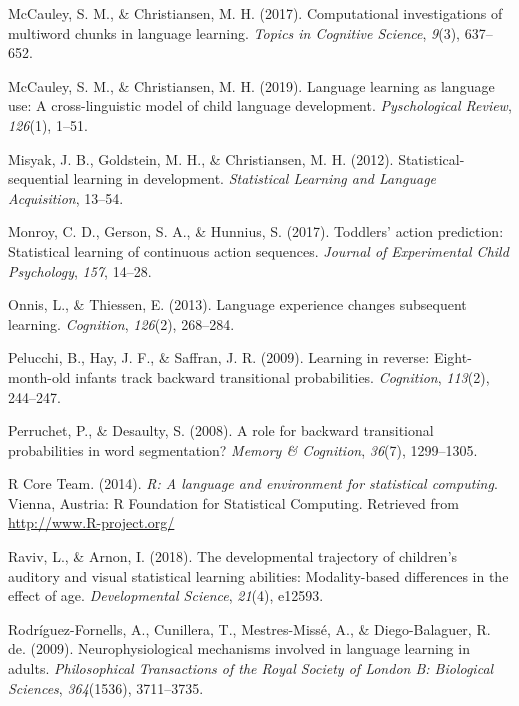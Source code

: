 \documentclass[man,mask,floatsintext]{apa6}
\begin{document}
\hypertarget{ref-mccauley2017computational}{}
McCauley, S. M., \& Christiansen, M. H. (2017). Computational
investigations of multiword chunks in language learning. \emph{Topics in
Cognitive Science}, \emph{9}(3), 637--652.

\hypertarget{ref-mccauley2019languagelearning}{}
McCauley, S. M., \& Christiansen, M. H. (2019). Language learning as
language use: A cross-linguistic model of child language development.
\emph{Pyschological Review}, \emph{126}(1), 1--51.

\hypertarget{ref-misyak2012statistical}{}
Misyak, J. B., Goldstein, M. H., \& Christiansen, M. H. (2012).
Statistical-sequential learning in development. \emph{Statistical
Learning and Language Acquisition}, 13--54.

\hypertarget{ref-monroy2017toddlers}{}
Monroy, C. D., Gerson, S. A., \& Hunnius, S. (2017). Toddlers' action
prediction: Statistical learning of continuous action sequences.
\emph{Journal of Experimental Child Psychology}, \emph{157}, 14--28.

\hypertarget{ref-onnis2013language}{}
Onnis, L., \& Thiessen, E. (2013). Language experience changes
subsequent learning. \emph{Cognition}, \emph{126}(2), 268--284.

\hypertarget{ref-pelucchi2009learning}{}
Pelucchi, B., Hay, J. F., \& Saffran, J. R. (2009). Learning in reverse:
Eight-month-old infants track backward transitional probabilities.
\emph{Cognition}, \emph{113}(2), 244--247.

\hypertarget{ref-perruchet2008role}{}
Perruchet, P., \& Desaulty, S. (2008). A role for backward transitional
probabilities in word segmentation? \emph{Memory \& Cognition},
\emph{36}(7), 1299--1305.

\hypertarget{ref-R}{}
R Core Team. (2014). \emph{R: A language and environment for statistical
computing}. Vienna, Austria: R Foundation for Statistical Computing.
Retrieved from \url{http://www.R-project.org/}

\hypertarget{ref-raviv2018developmental}{}
Raviv, L., \& Arnon, I. (2018). The developmental trajectory of
children's auditory and visual statistical learning abilities:
Modality-based differences in the effect of age. \emph{Developmental
Science}, \emph{21}(4), e12593.

\hypertarget{ref-rodriguez2009neurophysiological}{}
Rodríguez-Fornells, A., Cunillera, T., Mestres-Missé, A., \&
Diego-Balaguer, R. de. (2009). Neurophysiological mechanisms involved in
language learning in adults. \emph{Philosophical Transactions of the
Royal Society of London B: Biological Sciences}, \emph{364}(1536),
3711--3735.
\end{document}
